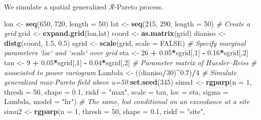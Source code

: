 \documentclass[]{book}
\newenvironment{Shaded}{\begin{snugshade}}{\end{snugshade}}
\newcommand{\CommentTok}[1]{\textcolor[rgb]{0.56,0.35,0.01}{\textit{#1}}}
\newcommand{\DataTypeTok}[1]{\textcolor[rgb]{0.13,0.29,0.53}{#1}}
\newcommand{\DecValTok}[1]{\textcolor[rgb]{0.00,0.00,0.81}{#1}}
\newcommand{\FloatTok}[1]{\textcolor[rgb]{0.00,0.00,0.81}{#1}}
\newcommand{\KeywordTok}[1]{\textcolor[rgb]{0.13,0.29,0.53}{\textbf{#1}}}
\newcommand{\NormalTok}[1]{#1}
\newcommand{\OperatorTok}[1]{\textcolor[rgb]{0.81,0.36,0.00}{\textbf{#1}}}
\newcommand{\OtherTok}[1]{\textcolor[rgb]{0.56,0.35,0.01}{#1}}
\newcommand{\StringTok}[1]{\textcolor[rgb]{0.31,0.60,0.02}{#1}}
\begin{document}
We simulate a spatial generalized \(\mathcal{R}\)-Pareto process.

\begin{Shaded}
\begin{Highlighting}[]
\NormalTok{ lon <-}\StringTok{ }\KeywordTok{seq}\NormalTok{(}\DecValTok{650}\NormalTok{, }\DecValTok{720}\NormalTok{, }\DataTypeTok{length =} \DecValTok{50}\NormalTok{)}
\NormalTok{ lat <-}\StringTok{ }\KeywordTok{seq}\NormalTok{(}\DecValTok{215}\NormalTok{, }\DecValTok{290}\NormalTok{, }\DataTypeTok{length =} \DecValTok{50}\NormalTok{)}
 \CommentTok{# Create a grid}
\NormalTok{ grid <-}\StringTok{ }\KeywordTok{expand.grid}\NormalTok{(lon,lat)}
\NormalTok{ coord <-}\StringTok{ }\KeywordTok{as.matrix}\NormalTok{(grid)}
\NormalTok{ dianiso <-}\StringTok{ }\KeywordTok{distg}\NormalTok{(coord, }\FloatTok{1.5}\NormalTok{, }\FloatTok{0.5}\NormalTok{)}
\NormalTok{ sgrid <-}\StringTok{ }\KeywordTok{scale}\NormalTok{(grid, }\DataTypeTok{scale =} \OtherTok{FALSE}\NormalTok{)}
 \CommentTok{# Specify marginal parameters `loc` and `scale` over grid}
\NormalTok{ eta <-}\StringTok{ }\DecValTok{26} \OperatorTok{+}\StringTok{ }\FloatTok{0.05}\OperatorTok{*}\NormalTok{sgrid[,}\DecValTok{1}\NormalTok{] }\OperatorTok{-}\StringTok{ }\FloatTok{0.16}\OperatorTok{*}\NormalTok{sgrid[,}\DecValTok{2}\NormalTok{]}
\NormalTok{ tau <-}\StringTok{ }\DecValTok{9} \OperatorTok{+}\StringTok{ }\FloatTok{0.05}\OperatorTok{*}\NormalTok{sgrid[,}\DecValTok{1}\NormalTok{] }\OperatorTok{-}\StringTok{ }\FloatTok{0.04}\OperatorTok{*}\NormalTok{sgrid[,}\DecValTok{2}\NormalTok{]}
 \CommentTok{# Parameter matrix of Huesler--Reiss}
 \CommentTok{# associated to power variogram}
\NormalTok{ Lambda <-}\StringTok{ }\NormalTok{((dianiso}\OperatorTok{/}\DecValTok{30}\NormalTok{)}\OperatorTok{^}\FloatTok{0.7}\NormalTok{)}\OperatorTok{/}\DecValTok{4}
 \CommentTok{# Simulate generalized max-Pareto field above u=50}
 \KeywordTok{set.seed}\NormalTok{(}\DecValTok{345}\NormalTok{)}
\NormalTok{ simu1 <-}\StringTok{ }\KeywordTok{rgparp}\NormalTok{(}\DataTypeTok{n =} \DecValTok{1}\NormalTok{, }\DataTypeTok{thresh =} \DecValTok{50}\NormalTok{, }\DataTypeTok{shape =} \FloatTok{0.1}\NormalTok{, }\DataTypeTok{riskf =} \StringTok{"max"}\NormalTok{,}
                 \DataTypeTok{scale =}\NormalTok{ tau, }\DataTypeTok{loc =}\NormalTok{ eta, }\DataTypeTok{sigma =}\NormalTok{ Lambda, }\DataTypeTok{model =} \StringTok{"hr"}\NormalTok{)}
\CommentTok{# The same, but conditional on an exceedance at a site    }
\NormalTok{simu2 <-}\StringTok{ }\KeywordTok{rgparp}\NormalTok{(}\DataTypeTok{n =} \DecValTok{1}\NormalTok{, }\DataTypeTok{thresh =} \DecValTok{50}\NormalTok{, }\DataTypeTok{shape =} \FloatTok{0.1}\NormalTok{, }\DataTypeTok{riskf =} \StringTok{"site"}\NormalTok{, }

\end{Highlighting}
\end{Shaded}
\end{document}
